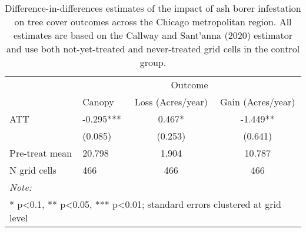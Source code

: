 \begin{table}[!h]

\caption{\label{tab:grid-tree-table}Difference-in-differences estimates of the impact of ash borer infestation on tree cover outcomes across the Chicago metropolitan region. All estimates are based on the Callway and Sant'anna (2020) estimator and use both not-yet-treated and never-treated grid cells in the control group.}
\centering
\begin{tabular}[t]{llcc}
\toprule
\multicolumn{1}{c}{ } & \multicolumn{3}{c}{Outcome} \\
\cmidrule(l{3pt}r{3pt}){2-4}
  & Canopy & Loss (Acres/year) & Gain (Acres/year)\\
\midrule
ATT & -0.295*** & 0.467* & -1.449**\\
 & (0.085) & (0.253) & (0.641)\\
\midrule
Pre-treat mean & 20.798 & 1.904 & 10.787\\
N grid cells & 466 & 466 & 466\\
\bottomrule
\multicolumn{4}{l}{\rule{0pt}{1em}\textit{Note: }}\\
\multicolumn{4}{l}{\rule{0pt}{1em}* p<0.1, ** p<0.05, *** p<0.01; standard errors clustered at grid level}\\
\end{tabular}
\end{table}

